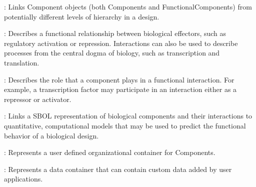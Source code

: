 \begin{description}
\item \emph{}:
Links Component objects (both Components and FunctionalComponents) from potentially different levels of hierarchy in a design.
\item \emph{}:
Describes a functional relationship between biological effectors, such as regulatory activation or repression.  Interactions can also be used to describe processes from the central dogma of biology, such as transcription and translation.
\item \emph{}:
Describes the role that a component plays in a functional interaction.  For example, a transcription factor may participate in an interaction either as a repressor or activator.
\item \emph{}:
Links a SBOL representation of biological components and their interactions to quantitative, computational models that may be used to predict the functional behavior of a biological design.
\item \emph{}:
Represents a user defined organizational container for Components.
\item \emph{}:
Represents a data container that can contain custom data added by user applications.
\end{description}
